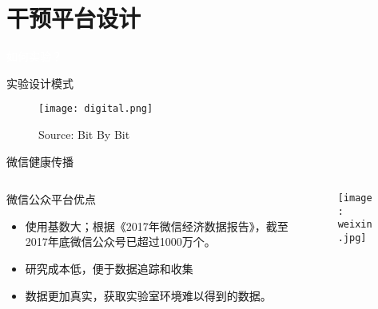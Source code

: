 \section{干预平台设计}
\begin{frame}[plain, b]

\centering
\huge \textcolor{white}{如何实验？}
\normalsize

\vspace*{\fill}


\end{frame}
\begin{frame}{实验设计模式}
\begin{figure}[h]
    \centering
    \texttt{[image: digital.png]}
    \caption{Source: Bit By Bit }
\end{figure}
\end{frame}
\begin{frame}{微信健康传播}
\begin{columns}
    \begin{column}{0.5\textwidth}
\begin{block}{微信公众平台优点}
\begin{itemize}
    \item 使用基数大；根据《2017年微信经济数据报告》，截至2017年底微信公众号已超过1000万个。
    \item 研究成本低，便于数据追踪和收集
    \item 数据更加真实，获取实验室环境难以得到的数据。
\end{itemize}
\end{block}
    \end{column}
\begin{column}{0.5\textwidth}
\begin{figure}[h]
    \texttt{[image: weixin.jpg]}
\end{figure}
\end{column}
\end{columns}
\end{frame}

